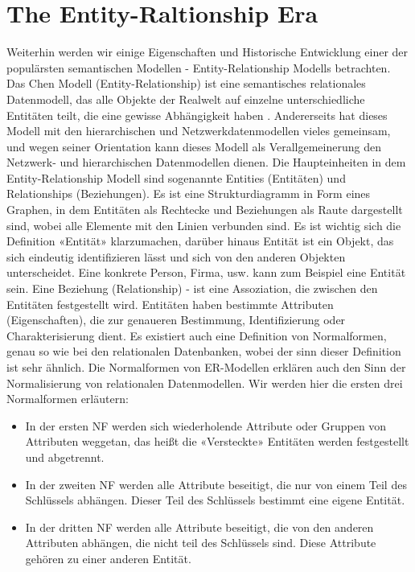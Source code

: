     

\section{The Entity-Raltionship Era}

Weiterhin werden wir einige Eigenschaften und Historische Entwicklung einer der populärsten semantischen Modellen - Entity-Relationship Modells betrachten. Das Chen Modell (Entity-Relationship) ist eine semantisches relationales Datenmodell, das alle Objekte der Realwelt auf einzelne unterschiedliche Entitäten teilt, die eine gewisse Abhängigkeit haben \cite{chen1976entity}.  Andererseits hat dieses Modell mit den hierarchischen und Netzwerkdatenmodellen vieles gemeinsam, und wegen seiner Orientation kann dieses Modell als Verallgemeinerung den Netzwerk- und hierarchischen Datenmodellen dienen. Die Haupteinheiten in dem Entity-Relationship Modell sind sogenannte Entities (Entitäten) und Relationships (Beziehungen). Es ist eine Strukturdiagramm in Form eines Graphen, in dem Entitäten als Rechtecke und Beziehungen als Raute dargestellt sind, wobei alle Elemente mit den Linien verbunden sind. Es ist wichtig sich die Definition «Entität» klarzumachen, darüber hinaus Entität ist ein Objekt, das sich eindeutig identifizieren lässt und sich von den anderen Objekten unterscheidet. Eine konkrete Person, Firma, usw. kann zum Beispiel eine Entität sein. Eine Beziehung (Relationship) - ist eine Assoziation, die zwischen den Entitäten festgestellt wird. Entitäten haben bestimmte Attributen (Eigenschaften), die zur genaueren Bestimmung, Identifizierung oder Charakterisierung dient. Es existiert auch eine Definition von Normalformen, genau so wie bei den relationalen Datenbanken, wobei der sinn dieser Definition ist sehr ähnlich. Die Normalformen von ER-Modellen erklären auch den Sinn der Normalisierung von relationalen Datenmodellen. Wir werden hier die ersten drei Normalformen erläutern:
\begin{itemize}
\item  In der ersten NF werden sich wiederholende Attribute oder Gruppen von Attributen weggetan, das heißt die «Versteckte» Entitäten werden festgestellt und abgetrennt.
\item  In der zweiten NF werden alle Attribute beseitigt, die nur von einem Teil des Schlüssels abhängen. Dieser Teil des Schlüssels bestimmt eine eigene Entität. 
\item  In der dritten NF werden alle Attribute beseitigt, die von den anderen Attributen abhängen, die nicht teil des Schlüssels sind. Diese Attribute gehören zu einer anderen Entität.
\end{itemize}


